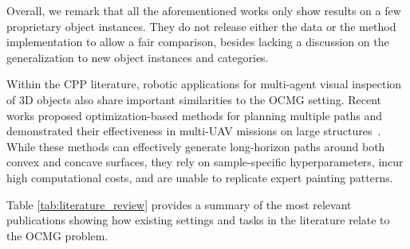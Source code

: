 Overall, we remark that all the aforementioned works only show results on a few proprietary object instances. They do not release either the data or the method implementation to allow a fair comparison, besides lacking a discussion on the generalization to new object instances and categories.

Within the CPP literature, robotic applications for multi-agent visual inspection of 3D objects also share important similarities to the OCMG setting.
Recent works proposed optimization-based methods for planning multiple paths and demonstrated their effectiveness in multi-UAV missions on large structures~\cite{jing2020multi,multiUAV_2023}. While these methods can effectively generate long-horizon paths around both convex and concave surfaces, 
they rely on sample-specific hyperparameters, incur high computational costs, and are unable to replicate expert painting patterns.

Table \ref{tab:literature_review} provides a summary of the most relevant publications showing how existing settings and tasks in the literature relate to the OCMG problem.